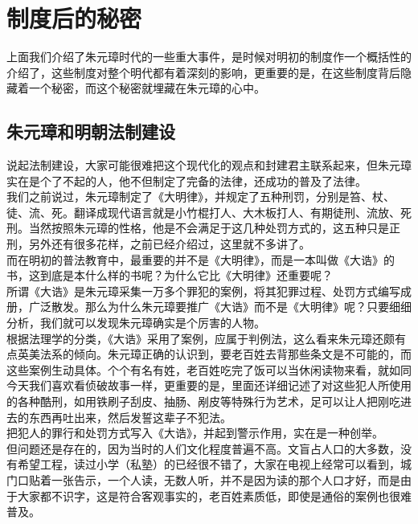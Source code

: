 \section{制度后的秘密}
\ifnum{}
	\begin{multicols}{\theparacolNo}
\fi
上面我们介绍了朱元璋时代的一些重大事件，是时候对明初的制度作一个概括性的介绍了，这些制度对整个明代都有着深刻的影响，更重要的是，在这些制度背后隐藏着一个秘密，而这个秘密就埋藏在朱元璋的心中。\\

\subsection{朱元璋和明朝法制建设}
说起法制建设，大家可能很难把这个现代化的观点和封建君主联系起来，但朱元璋实在是个了不起的人，他不但制定了完备的法律，还成功的普及了法律。\\

我们之前说过，朱元璋制定了《大明律》，并规定了五种刑罚，分别是笞、杖、徒、流、死。翻译成现代语言就是小竹棍打人、大木板打人、有期徒刑、流放、死刑。当然按照朱元璋的性格，他是不会满足于这几种处罚方式的，这五种只是正刑，另外还有很多花样，之前已经介绍过，这里就不多讲了。\\

而在明初的普法教育中，最重要的并不是《大明律》，而是一本叫做《大诰》的书，这到底是本什么样的书呢？为什么它比《大明律》还重要呢？\\

所谓《大诰》是朱元璋采集一万多个罪犯的案例，将其犯罪过程、处罚方式编写成册，广泛散发。那么为什么朱元璋要推广《大诰》而不是《大明律》呢？只要细细分析，我们就可以发现朱元璋确实是个厉害的人物。\\

根据法理学的分类，《大诰》采用了案例，应属于判例法，这么看来朱元璋还颇有点英美法系的倾向。朱元璋正确的认识到，要老百姓去背那些条文是不可能的，而这些案例生动具体。个个有名有姓，老百姓吃完了饭可以当休闲读物来看，就如同今天我们喜欢看侦破故事一样，更重要的是，里面还详细记述了对这些犯人所使用的各种酷刑，如用铁刷子刮皮、抽肠、剐皮等特殊行为艺术，足可以让人把刚吃进去的东西再吐出来，然后发誓这辈子不犯法。\\

把犯人的罪行和处罚方式写入《大诰》，并起到警示作用，实在是一种创举。\\

但问题还是存在的，因为当时的人们文化程度普遍不高。文盲占人口的大多数，没有希望工程，读过小学（私塾）的已经很不错了，大家在电视上经常可以看到，城门口贴着一张告示，一个人读，无数人听，并不是因为读的那个人口才好，而是由于大家都不识字，这是符合客观事实的，老百姓素质低，即使是通俗的案例也很难普及。\\


\end{multicols}

